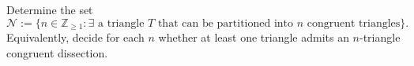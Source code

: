 Determine the set
\[
\mathcal{N}:=\{n\in\mathbb{Z}_{\ge 1}: \exists\text{ a triangle }T\text{ that can be partitioned into }n\text{ congruent triangles}\}.
\]
Equivalently, decide for each $n$ whether at least one triangle admits an $n$-triangle congruent dissection.
